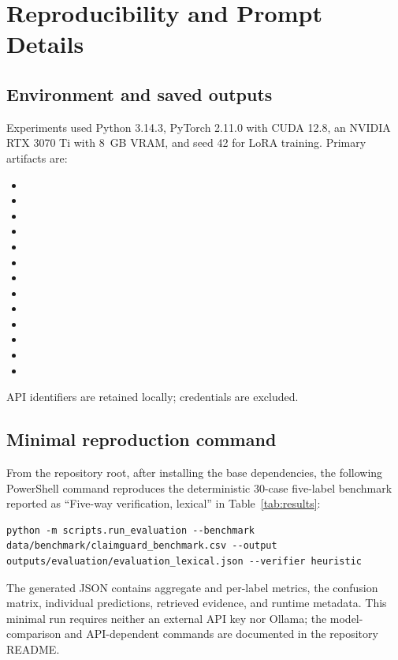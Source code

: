\documentclass[12pt,toc=bib,toc=listof]{scrartcl}
\begin{document}
\clearpage
\appendix
\section{Reproducibility and Prompt Details}
\label{app:prompt}

\subsection{Environment and saved outputs}
Experiments used Python 3.14.3, PyTorch 2.11.0 with CUDA 12.8, an NVIDIA RTX 3070 Ti with 8~GB VRAM, and seed 42 for LoRA training. Primary artifacts are:
\begin{itemize}
  \item {}
  \item {}
  \item {}
  \item {}
  \item {}
  \item {}
  \item {}
  \item {}
  \item {}
  \item {}
  \item {}
  \item {}
  \item {}
\end{itemize}
API identifiers are retained locally; credentials are excluded.

\subsection{Minimal reproduction command}
From the  repository root, after installing the base dependencies, the following PowerShell command reproduces the deterministic 30-case five-label benchmark reported as ``Five-way verification, lexical'' in Table~\ref{tab:results}:
\begin{lstlisting}
python -m scripts.run_evaluation --benchmark data/benchmark/claimguard_benchmark.csv --output outputs/evaluation/evaluation_lexical.json --verifier heuristic
\end{lstlisting}
The generated JSON contains aggregate and per-label metrics, the confusion matrix, individual predictions, retrieved evidence, and runtime metadata. This minimal run requires neither an external API key nor Ollama; the model-comparison and API-dependent commands are documented in the repository README.
\end{document}
